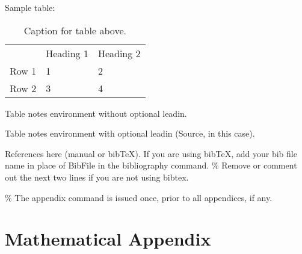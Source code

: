 \documentclass[AER]{AEA}
\begin{document}
Sample table:

\begin{table}
\caption{Caption for table above.}

\begin{tabular}{lll}
& Heading 1 & Heading 2 \\
Row 1 & 1 & 2 \\
Row 2 & 3 & 4%
\end{tabular}
\begin{tablenotes}
Table notes environment without optional leadin.
\end{tablenotes}
\begin{tablenotes}[Source]
Table notes environment with optional leadin (Source, in this case).
\end{tablenotes}
\end{table}

References here (manual or bibTeX). If you are using bibTeX, add your
bib file name in place of BibFile in the bibliography command. \% Remove
or comment out the next two lines if you are not using bibtex.




\% The appendix command is issued once, prior to all appendices, if any.
\appendix

\section{Mathematical Appendix}
\end{document}
